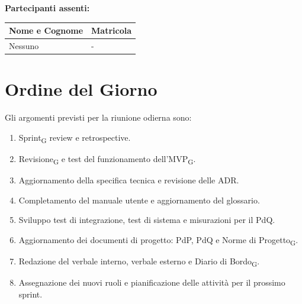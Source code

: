 \vspace{0.5cm}

\textbf{Partecipanti assenti:}

\begin{table}[ht]

\centering

\renewcommand{\arraystretch}{1.2}

\begin{tabularx}{\textwidth}{X l}

\toprule

\textbf{Nome e Cognome} & \textbf{Matricola} \\

\midrule

Nessuno & - \\

\bottomrule

\end{tabularx}

\end{table}



\section{Ordine del Giorno}

Gli argomenti previsti per la riunione odierna sono:

\begin{enumerate}

\item Sprint\textsubscript{G} review e retrospective.

\item Revisione\textsubscript{G} e test del funzionamento dell'MVP\textsubscript{G}.

\item Aggiornamento della specifica tecnica e revisione delle ADR.

\item Completamento del manuale utente e aggiornamento del glossario.

\item Sviluppo test di integrazione, test di sistema e misurazioni per il PdQ.

\item Aggiornamento dei documenti di progetto: PdP, PdQ e Norme di Progetto\textsubscript{G}.

\item Redazione del verbale interno, verbale esterno e Diario di Bordo\textsubscript{G}.

\item Assegnazione dei nuovi ruoli e pianificazione delle attività per il prossimo sprint.

\end{enumerate}


